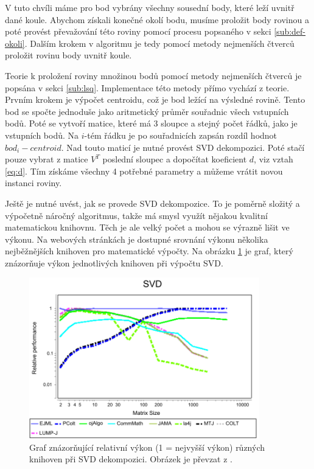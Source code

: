 \documentclass[11pt,twoside,a4paper]{book}
\begin{document}
V tuto chvíli máme pro bod vybrány všechny sousední body, které leží uvnitř dané koule. Abychom získali konečné okolí bodu, musíme proložit body rovinou a poté provést převažování této roviny pomocí procesu popsaného v sekci \ref{sub:def-okoli}. Dalším krokem v algoritmu je tedy pomocí metody nejmenších čtverců proložit rovinu body uvnitř koule.

Teorie k proložení roviny množinou bodů pomocí metody nejmenších čtverců je popsána v sekci \ref{sub:lsq}. Implementace této metody přímo vychází z teorie. Prvním krokem je výpočet centroidu, což je bod ležící na výsledné rovině. Tento bod se spočte jednoduše jako aritmetický průměr souřadnic všech vstupních bodů. Poté se vytvoří matice, které má 3 sloupce a stejný počet řádků, jako je vstupních bodů. Na $i$-tém řádku je po souřadnicích zapsán rozdíl hodnot $bod_i - centroid$. Nad touto maticí je nutné provést SVD dekompozici. Poté stačí pouze vybrat z matice $V^T$ poslední sloupec a dopočítat koeficient $d$, viz vztah \ref{eq:d}. Tím získáme všechny 4 potřebné parametry a můžeme vrátit novou instanci roviny.

Ještě je nutné uvést, jak se provede SVD dekompozice. To je poměrně složitý a výpočetně náročný algoritmus, takže má smysl využít nějakou kvalitní matematickou knihovnu. Těch je ale velký počet a mohou se výrazně lišit ve výkonu. Na webových stránkách \cite{svdbench} je dostupné srovnání výkonu několika nejběžnějších knihoven pro matematické výpočty. Na obrázku \ref{fig:svd-bench} je graf, který znázorňuje výkon jednotlivých knihoven při výpočtu SVD.

\begin{figure}[ht]
\begin{center}
\includegraphics[width=10cm]{figures/svd}
\caption{Graf znázorňující relativní výkon (1 = nejvyšší výkon) různých knihoven při SVD dekompozici. Obrázek je převzat z \cite{svdbench}.}
\label{fig:svd-bench}
\end{center}
\end{figure}
\end{document}

